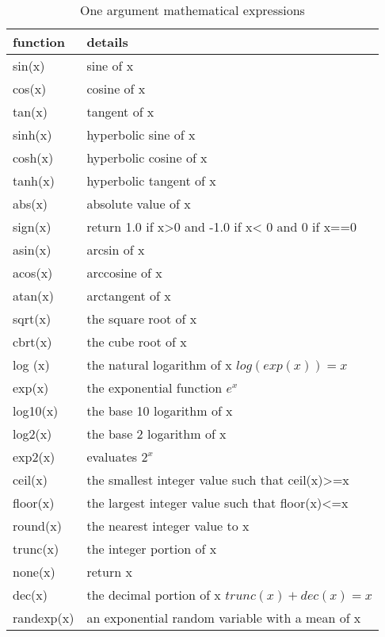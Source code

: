 \documentclass[12pt]{article} %
\begin{document}
\begin{table}[ht]

    \caption{One argument mathematical expressions} %
    \centering %
    \begin{tabular}{l p{11cm}} %
        \hline %
        function & details \\ [0.5ex] %
        \hline %
        sin(x)  & sine of x \\
        cos(x)  & cosine of x \\
        tan(x)  & tangent of x \\
        sinh(x)  & hyperbolic sine of x \\
        cosh(x)  & hyperbolic cosine of x \\
        tanh(x)  & hyperbolic tangent of x \\
        abs(x)  & absolute value of x \\
        sign(x) & return 1.0 if x>0 and -1.0 if x< 0 and 0 if x==0 \\
        asin(x) & arcsin of x \\
        acos(x) & arccosine of x \\
        atan(x) & arctangent of x \\
        sqrt(x) & the square root of x \\
        cbrt(x) & the cube root of x \\
        log (x) & the natural logarithm of x $log(exp(x))=x$\\
        exp(x)  & the exponential function $e^x$ \\
        log10(x) & the base 10 logarithm of x \\
        log2(x) & the base 2 logarithm of x \\
        exp2(x) & evaluates $2^x$ \\
        ceil(x) & the smallest integer value such that ceil(x)>=x \\
        floor(x) & the largest integer value such that floor(x)<=x \\
        round(x) & the nearest integer value to x \\
        trunc(x) & the integer portion of x \\
        none(x)  & return x \\
        dec(x) & the decimal portion of x $trunc(x)+dec(x)=x$\\
        randexp(x) & an exponential random variable with a mean of x \\
        \hline %
    \end{tabular}
    \label{table:func1}
\end{table}
\end{document}
